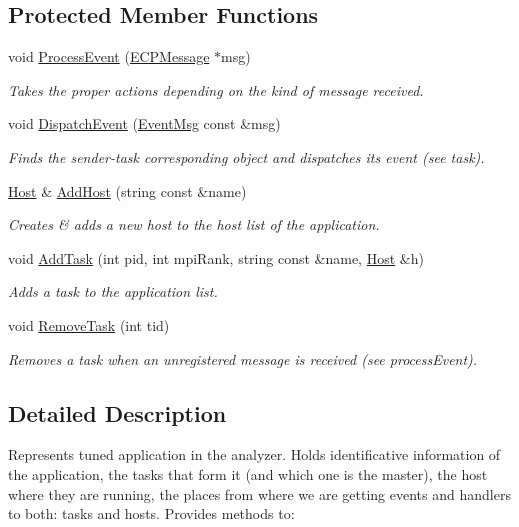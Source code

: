 \subsection*{Protected Member Functions}
\begin{DoxyCompactItemize}
\item 
void \hyperlink{class_model_1_1_application_a5d3109b0e0220d8ccdf68ca3a6a9dbd1}{Process\-Event} (\hyperlink{class_common_1_1_e_c_p_message}{E\-C\-P\-Message} $\ast$msg)
\begin{DoxyCompactList}\small\item\em Takes the proper actions depending on the kind of message received. \end{DoxyCompactList}\item 
void \hyperlink{class_model_1_1_application_a07458796fbf3b7ec4880cdecd74955a7}{Dispatch\-Event} (\hyperlink{class_common_1_1_event_msg}{Event\-Msg} const \&msg)
\begin{DoxyCompactList}\small\item\em Finds the sender-\/task corresponding object and dispatches its event (see task). \end{DoxyCompactList}\item 
\hyperlink{class_model_1_1_host}{Host} \& \hyperlink{class_model_1_1_application_ac1a97bc607a531c995781b227a974964}{Add\-Host} (string const \&name)
\begin{DoxyCompactList}\small\item\em Creates \& adds a new host to the host list of the application. \end{DoxyCompactList}\item 
void \hyperlink{class_model_1_1_application_a2984c77612af632e4908876f240b3a5b}{Add\-Task} (int pid, int mpi\-Rank, string const \&name, \hyperlink{class_model_1_1_host}{Host} \&h)
\begin{DoxyCompactList}\small\item\em Adds a task to the application list. \end{DoxyCompactList}\item 
void \hyperlink{class_model_1_1_application_a4fad9da559357f9187c23a3bf76a69bf}{Remove\-Task} (int tid)
\begin{DoxyCompactList}\small\item\em Removes a task when an unregistered message is received (see process\-Event). \end{DoxyCompactList}\end{DoxyCompactItemize}


\subsection{Detailed Description}
Represents tuned application in the analyzer. Holds identificative information of the application, the tasks that form it (and which one is the master), the host where they are running, the places from where we are getting events and handlers to both\-: tasks and hosts. Provides methods to\-: 


